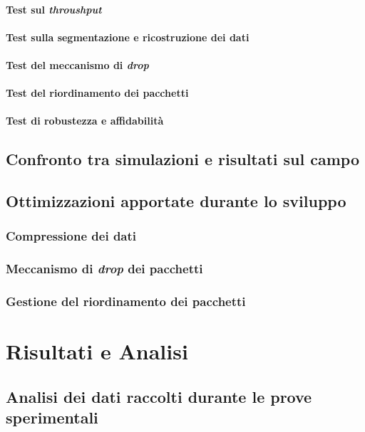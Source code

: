 \documentclass[12pt,a4paper,twoside]{book}
\begin{document}
\subsubsection{Test sul \emph{throushput}}
\subsubsection{Test sulla segmentazione e ricostruzione dei dati}
\subsubsection{Test del meccanismo di \emph{drop}}
\subsubsection{Test del riordinamento dei pacchetti}
\subsubsection{Test di robustezza e affidabilità}

\section{Confronto tra simulazioni e risultati sul campo}


\section{Ottimizzazioni apportate durante lo sviluppo}
\subsection{Compressione dei dati}
\subsection{Meccanismo di \emph{drop} dei pacchetti}
\subsection{Gestione del riordinamento dei pacchetti}

\chapter{Risultati e Analisi} \label{chap:results}

\section{Analisi dei dati raccolti durante le prove sperimentali}
\end{document}
